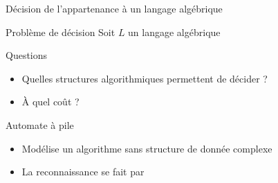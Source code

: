 
\begingroup

\begin{frame}{Décision de l'appartenance à un langage algébrique}

  \begin{block}{Problème de décision}
    Soit $L$ un langage algébrique
    
  \end{block}

  \begin{alertblock}{Questions}
    \begin{itemize}
    \item Quelles structures algorithmiques permettent de décider  ?
    \item À quel coût ?
    \end{itemize}
  \end{alertblock}
  
  \begin{block}{Automate à pile}
    \begin{itemize}
    \item Modélise un algorithme  sans structure de donnée complexe
    \item La reconnaissance se fait par 
    \end{itemize}
  \end{block}

\end{frame}

\endgroup
\endinput
